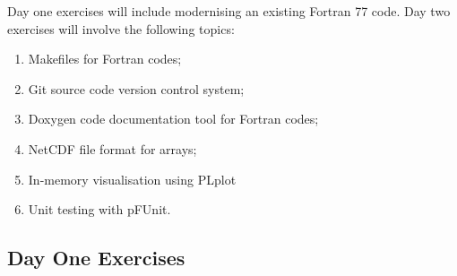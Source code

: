 \documentclass[12pt]{article}
\begin{document}
Day one exercises will include modernising an existing Fortran 77 code. Day two exercises will involve the 
following topics:
\begin{enumerate}
\item Makefiles for Fortran codes;
\item Git source code version control system;
\item Doxygen code documentation tool for Fortran codes;
\item NetCDF file format for arrays;
\item In-memory visualisation using PLplot
\item Unit testing with pFUnit.
\end{enumerate}
\newpage
\subsection*{Day One Exercises}
\setdefaultleftmargin{0pt}{}{}{}{}{}
\end{document}
